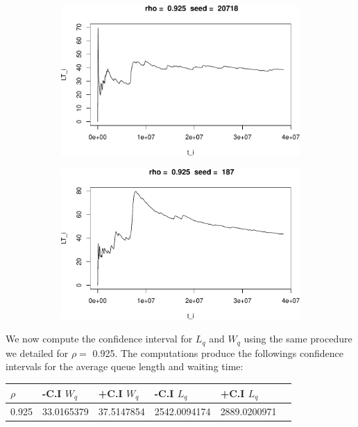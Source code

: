 \documentclass[]{article}
\begin{document}
\begin{figure}[h!]
\begin{subfigure}[b]{.55\linewidth}
\includegraphics[width=\linewidth]{003_files/figure-latex/unnamed-chunk-22-9.pdf}
\end{subfigure}\hfill
\begin{subfigure}[b]{.55\linewidth}
\includegraphics[width=\linewidth]{003_files/figure-latex/unnamed-chunk-22-10.pdf}
\end{subfigure}\vfill
\end{figure}




We now compute the confidence interval for \(L_{q}\) and \(W_{q}\) using
the same procedure we detailed for \(\rho =\) 0.925. The computations
produce the followings confidence intervals for the average queue length
and waiting time:

\begin{longtable}[]{@{}llllll@{}}
\toprule
\(\rho\) & -C.I \(W_{q}\) & +C.I \(W_{q}\) & -C.I \(L_{q}\) & +C.I
\(L_{q}\) &\tabularnewline
\midrule
\endhead
0.925 & 33.0165379 & 37.5147854 & 2542.0094174 &
2889.0200971\tabularnewline
\bottomrule
\end{longtable}
\end{document}
